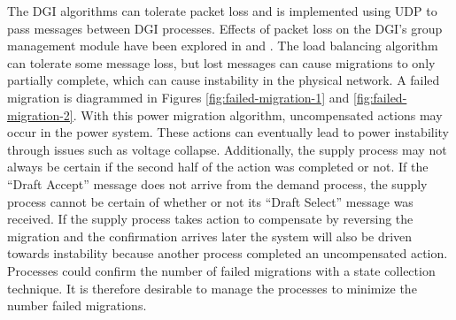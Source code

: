 The \ac{DGI} algorithms can tolerate packet loss and is implemented using UDP to pass messages between \ac{DGI} processes.
Effects of packet loss on the \ac{DGI}'s group management module have been explored in \cite{CRITIS2012} and \cite{JOURNAL}.
The load balancing algorithm can tolerate some message loss, but lost messages can cause migrations to only partially complete, which can cause instability in the physical network.
A failed migration is diagrammed in Figures \ref{fig:failed-migration-1} and \ref{fig:failed-migration-2}.
With this power migration algorithm, uncompensated actions may occur in the power system.
These actions can eventually lead to power instability through issues such as voltage collapse.
Additionally, the supply process may not always be certain if the second half of the action was completed or not.
If the ``Draft Accept'' message does not arrive from the demand process, the supply process cannot be certain of whether or not its ``Draft Select'' message was received.
If the supply process takes action to compensate by reversing the migration and the confirmation arrives later the system will also be driven towards instability because another process completed an uncompensated action.
Processes could confirm the number of failed migrations with a state collection technique.
It is therefore desirable to manage the processes to minimize the number failed migrations.


